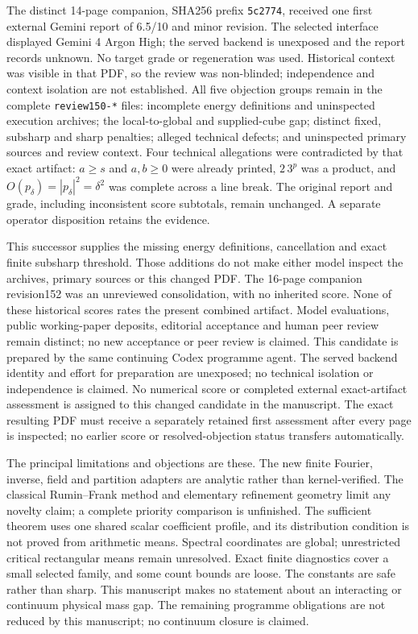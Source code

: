 \documentclass[11pt]{article}
\begin{document}
The distinct 14-page companion, SHA256 prefix \texttt{5c2774}, received
one first external Gemini report of 6.5/10 and minor revision. The selected
interface displayed Gemini 4 Argon High; the served backend is unexposed
and the report records unknown. No target grade or regeneration was used.
Historical context was visible in that PDF, so the review was non-blinded;
independence and context isolation are not established. All five objection
groups remain in the complete \texttt{review150-*} files: incomplete energy
definitions and uninspected execution archives; the local-to-global and
supplied-cube gap; distinct fixed, subsharp and sharp penalties; alleged
technical defects; and uninspected primary sources and review context.
Four technical allegations were contradicted by that exact artifact:
$a\geq s$ and $a,b\geq0$ were already printed, $2\,3^p$ was a product,
and $O(p_\delta)=|p_\delta|^2=\delta^2$ was complete across a line break.
The original report and grade, including inconsistent score subtotals,
remain unchanged. A separate operator disposition retains the evidence.

This successor supplies the missing energy definitions, cancellation and
exact finite subsharp threshold. Those additions do not make either model
inspect the archives, primary sources or this changed PDF. The 16-page
companion revision152 was an unreviewed consolidation, with no inherited
score. None of these historical scores rates the present combined artifact.
Model evaluations, public working-paper deposits, editorial acceptance and
human peer review remain distinct; no new acceptance or peer review is claimed.
This candidate is prepared by the same continuing Codex programme agent.
The served backend identity and effort for preparation are unexposed; no
technical isolation or independence is claimed. No numerical score or completed external exact-artifact assessment is assigned
to this changed candidate in the manuscript. The exact resulting PDF
must receive a separately retained first assessment after every page is inspected;
no earlier score or resolved-objection status transfers automatically.

The principal limitations and objections are these. The new finite Fourier, inverse,
field and partition adapters are analytic rather than kernel-verified. The classical
Rumin--Frank method and elementary refinement geometry limit any novelty claim; a
complete priority comparison is unfinished. The sufficient theorem uses one shared
scalar coefficient profile, and its distribution condition is not proved from arithmetic
means. Spectral coordinates are global; unrestricted critical rectangular means remain
unresolved. Exact finite diagnostics cover a small selected family, and some count bounds
are loose. The constants are safe rather than sharp. This manuscript makes no statement
about an interacting or continuum physical mass gap. The remaining programme obligations are not reduced by this manuscript; no continuum closure is claimed.
\end{document}
